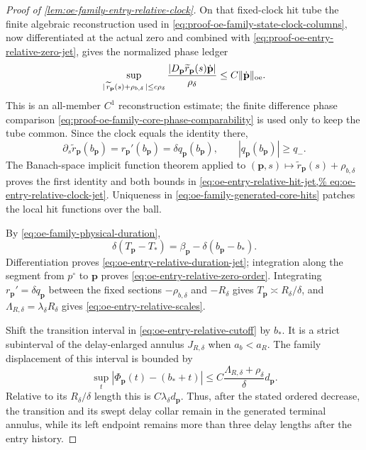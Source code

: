 \begin{proof}[Proof of
\cref{lem:oe-family-entry-relative-clock}]
On that fixed-clock hit tube the finite algebraic reconstruction used in
\cref{eq:proof-oe-family-state-clock-columns}, now differentiated at the
actual zero and combined with
\cref{eq:proof-oe-entry-relative-zero-jet}, gives the normalized phase
ledger
\begin{equation}
 \sup_{\substack{|\,\widetilde r_{\mathbf p}(s)
                        +\rho_{b,\delta}\,|
                        \le c\rho_\delta}}
 \frac{|D_{\mathbf p}\widetilde r_{\mathbf p}(s)
                 \dot{\mathbf p}|}{\rho_\delta}
 \le C\|\dot{\mathbf p}\|_{\rm oe}.             \label{eq:proof-oe-entry-relative-hit-state-jet}
\end{equation}
This is an all-member \(C^1\) reconstruction estimate; the finite
difference phase comparison
\cref{eq:proof-oe-family-core-phase-comparability} is used only to keep
the tube common.  Since the clock equals the identity there,
\[
 \partial_s\widetilde r_{\mathbf p}(b_{\mathbf p})
 =r_{\mathbf p}'(b_{\mathbf p})
 =\delta q_{\mathbf p}(b_{\mathbf p}),\qquad
 |q_{\mathbf p}(b_{\mathbf p})|\ge q_- .
\]
The Banach-space implicit function theorem applied to
\((\mathbf p,s)\mapsto
\widetilde r_{\mathbf p}(s)+\rho_{b,\delta}\) proves the first identity
and both bounds in
\cref{eq:oe-entry-relative-hit-jet,%
eq:oe-entry-relative-clock-jet}.  Uniqueness in
\cref{eq:oe-family-generated-core-hits} patches the local hit functions
over the ball.

By \cref{eq:oe-family-physical-duration},
\[
 \delta(T_{\mathbf p}-T_*)
 =\beta_{\mathbf p}-\delta(b_{\mathbf p}-b_*).
\]
Differentiation proves
\cref{eq:oe-entry-relative-duration-jet}; integration along the segment
from \(p^\circ\) to \(\mathbf p\) proves
\cref{eq:oe-entry-relative-zero-order}.  Integrating
\(r_{\mathbf p}'=\delta q_{\mathbf p}\) between the fixed sections
\(-\rho_{b,\delta}\) and \(-R_\delta\) gives
\(T_{\mathbf p}\asymp R_\delta/\delta\), and
\(\Lambda_{R,\delta}=\lambda_\delta R_\delta\) gives
\cref{eq:oe-entry-relative-scales}.

Shift the transition interval in
\cref{eq:oe-entry-relative-cutoff} by \(b_*\).  It is a strict
subinterval of the delay-enlarged annulus
\(J_{R,\delta}\) when \(a_b<a_R\).  The family displacement of this
interval is bounded by
\begin{equation}
 \sup_t|\Phi_{\mathbf p}(t)-(b_*+t)|
 \le C\frac{\Lambda_{R,\delta}+\rho_\delta}{\delta}
        d_{\mathbf p}.                          \label{eq:proof-oe-entry-relative-transition-displacement}
\end{equation}
Relative to its \(R_\delta/\delta\) length this is
\(C\lambda_\delta d_{\mathbf p}\).  Thus, after the stated ordered
decrease, the transition and its swept delay collar remain in the
generated terminal annulus, while its left endpoint remains more than
three delay lengths after the entry history.


\end{proof}
